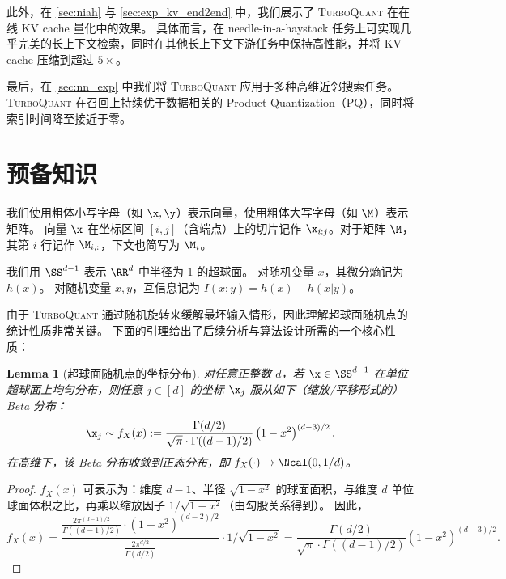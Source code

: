 \documentclass[11pt]{ctexart}
\newtheorem{lemma}{Lemma}
\newcommand{\TurboQuant}{\textsc{TurboQuant}\xspace}
\let\cref\ref
\begin{document}
此外，在 \cref{sec:niah} 与 \cref{sec:exp_kv_end2end} 中，我们展示了 \TurboQuant 在在线 KV cache 量化中的效果。 
具体而言，在 needle-in-a-haystack 任务上可实现几乎完美的长上下文检索，同时在其他长上下文下游任务中保持高性能，并将 KV cache 压缩到超过 $5\times$。

最后，在 \cref{sec:nn_exp} 中我们将 \TurboQuant 应用于多种高维近邻搜索任务。
\TurboQuant 在召回上持续优于数据相关的 Product Quantization（PQ），同时将索引时间降至接近于零。


\section{预备知识} \label{sec:prelim}
我们使用粗体小写字母（如 $\x,\y$）表示向量，使用粗体大写字母（如 $\M$）表示矩阵。
向量 $\x$ 在坐标区间 $[i,j]$（含端点）上的切片记作 $\x_{i:j}$。对于矩阵 $\M$，其第 $i$ 行记作 $\M_{i,:}$，下文也简写为 $\M_i$。

我们用 $\SS^{d-1}$ 表示 $\RR^d$ 中半径为 $1$ 的超球面。
对随机变量 $x$，其微分熵记为 $h(x)$。
对随机变量 $x,y$，互信息记为 $I(x; y)=h(x)-h(x|y)$。


由于 \TurboQuant 通过随机旋转来缓解最坏输入情形，因此理解超球面随机点的统计性质非常关键。
下面的引理给出了后续分析与算法设计所需的一个核心性质：

\begin{lemma}[超球面随机点的坐标分布]\label{lem_coordinate_distribution}
    对任意正整数 $d$，若 $\x \in \SS^{d-1}$ 在单位超球面上均匀分布，则任意 $j\in[d]$ 的坐标 $\x_j$ 服从如下（缩放/平移形式的）Beta 分布：
    \[
    \x_j \sim f_{X}(x) := \frac{\Gamma(d/2)}{\sqrt{\pi} \cdot \Gamma((d-1)/2)} \left( 1 - x^2 \right)^{(d-3)/2}.
    \]
    在高维下，该 Beta 分布收敛到正态分布，即 $f_{X}(\cdot) \to \Ncal(0, 1/d)$。
\end{lemma}
\begin{proof}
$f_X(x)$ 可表示为：维度 $d-1$、半径 $\sqrt{1-x^2}$ 的球面面积，与维度 $d$ 单位球面体积之比，再乘以缩放因子 $1/\sqrt{1-x^2}$（由勾股关系得到）。
因此，
\[
f_X(x) = \frac{\frac{2 \pi^{(d-1)/2}}{\Gamma((d-1)/2)} \cdot (1-x^2)^{(d-2)/2}}{\frac{2 \pi^{d/2}}{\Gamma(d/2)}} \cdot 1/\sqrt{1-x^2}= \frac{\Gamma(d/2)}{\sqrt{\pi} \cdot \Gamma((d-1)/2)} \left( 1 - x^2 \right)^{(d-3)/2}.
\]
\end{proof}
\end{document}
